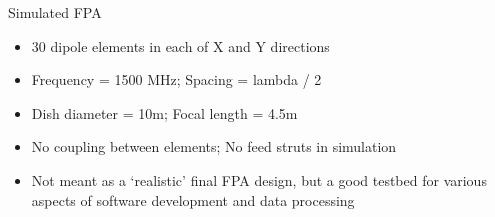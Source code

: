 \documentclass[pdf,azure,slideColor,colorBG]{prosper}
\begin{document}
\begin{slide}{Simulated FPA}
\begin{small}
\begin{itemize}
\item 30 dipole elements in each of X and Y directions
\item Frequency = 1500 MHz; Spacing = lambda / 2
\item Dish diameter = 10m; Focal length = 4.5m
\item No coupling between elements; No feed struts in simulation
\item Not meant as a `realistic' final FPA design, but a good
testbed for various aspects of software development and data processing
\end{itemize}
\end {small}
{\centering
{}
\par}
\end{slide}
\end{document}
